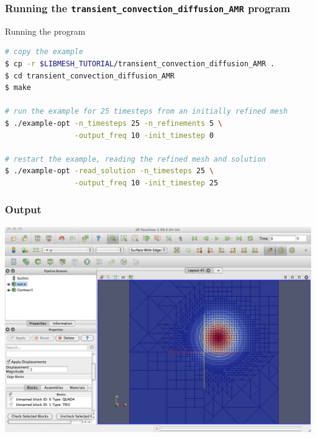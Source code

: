 \begin{frame}[fragile]
  \frametitle{Running the \texttt{transient\_convection\_diffusion\_AMR} program}
    \begin{block}{Running the program}
    \begin{lstlisting}[language=bash]
# copy the example
$ cp -r $LIBMESH_TUTORIAL/transient_convection_diffusion_AMR .
$ cd transient_convection_diffusion_AMR
$ make

# run the example for 25 timesteps from an initially refined mesh
$ ./example-opt -n_timesteps 25 -n_refinements 5 \
                -output_freq 10 -init_timestep 0

# restart the example, reading the refined mesh and solution
$ ./example-opt -read_solution -n_timesteps 25 \
                -output_freq 10 -init_timestep 25 
    \end{lstlisting}
  \end{block}
\end{frame}


\frame
{
  \frametitle{Output}
  \begin{center}
    \includegraphics[height=0.8\textheight]{tutorial/transient_convection_diffusion_AMR/screen}
  \end{center}
} 


